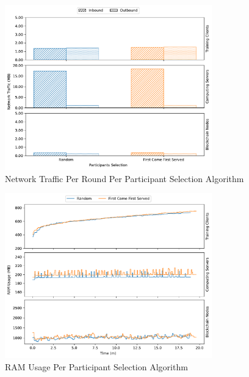 \begin{figure}[!ht]
    \centering
    \centering
    \includegraphics[width=0.8\textwidth]{graphics/selection/net.pdf}
    \caption{Network Traffic Per Round Per Participant Selection Algorithm}
    \label{fig:net_selection}
\end{figure}

\begin{figure}[!hpt]
    \centering
    \centering
    \includegraphics[width=0.8\textwidth]{graphics/selection/ram.pdf}
    \caption{RAM Usage Per Participant Selection Algorithm}
    \label{fig:ram_selection}
\end{figure}

